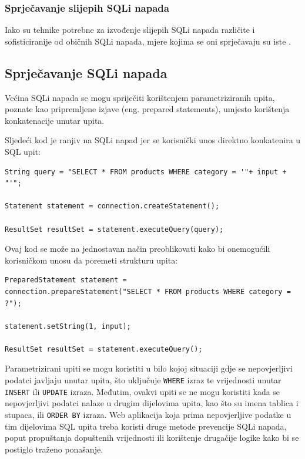 \documentclass[12pt, oneside, onecolumn]{book}
\begin{document}
{\subsubsection{Sprječavanje slijepih SQLi napada}
Iako su tehnike potrebne za izvođenje slijepih SQLi napada različite i sofisticiranije od običnih SQLi napada, mjere kojima se oni sprječavaju su iste \cite{blndsqli}.

\subsection{Sprječavanje SQLi napada}
Većina SQLi napada se mogu spriječiti korištenjem parametriziranih upita, poznate kao pripremljene izjave (eng. prepared statements), umjesto korištenja konkatenacije unutar upita. 

Sljedeći kod je ranjiv na SQLi napad jer se korisnički unos direktno konkatenira u SQL upit:

\begin{verbatim}
String query = "SELECT * FROM products WHERE category = '"+ input + "'";

Statement statement = connection.createStatement();

ResultSet resultSet = statement.executeQuery(query);
\end{verbatim}

Ovaj kod se može na jednostavan način preoblikovati kako bi onemogućili korisničkom unosu da poremeti strukturu upita:

\begin{verbatim}
PreparedStatement statement = 
connection.prepareStatement("SELECT * FROM products WHERE category = ?");

statement.setString(1, input);

ResultSet resultSet = statement.executeQuery();
\end{verbatim}

Parametrizirani upiti se mogu koristiti u bilo kojoj situaciji gdje se nepovjerljivi podatci javljaju unutar upita, što uključuje \texttt{WHERE} izraz te vrijednosti unutar \texttt{INSERT} ili \texttt{UPDATE} izraza. Međutim, ovakvi upiti se ne mogu koristiti kada se nepovjerljivi podatci nalaze u drugim dijelovima upita, kao što su imena tablica i stupaca, ili \texttt{ORDER BY} izraza. Web aplikacija koja prima nepovjerljive podatke u tim dijelovima SQL upita treba koristi druge metode prevencije SQLi napada, poput propuštanja dopuštenih vrijednosti ili korištenje drugačije logike kako bi se postiglo traženo ponašanje.

}
\end{document}
